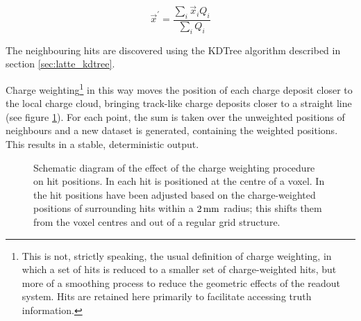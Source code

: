 \begin{equation}\label{eqn:charge_weighted_avg_position}
	\vec{x}^\prime = \frac{\displaystyle \sum_i \vec{x}_i Q_i}{\displaystyle \sum_i Q_i}
\end{equation}

The neighbouring hits are discovered using the \ac{KDTree} algorithm described in section \ref{sec:latte_kdtree}.

Charge weighting\footnote{This is not, strictly speaking, the usual definition of charge weighting, in which a set of hits is reduced to a smaller set of charge-weighted hits, but more of a smoothing process to reduce the geometric effects of the readout system. Hits are retained here primarily to facilitate accessing truth information.} in this way moves the position of each charge deposit closer to the local charge cloud, bringing track-like charge deposits closer to a straight line (see figure \ref{fig:ca_charge_weighting}). For each point, the sum is taken over the unweighted positions of neighbours and a new dataset is generated, containing the weighted positions. This results in a stable, deterministic output.

\begin{figure}
\centering
{}
\caption[Diagram of the effect of charge weighting on hit position]{\label{fig:ca_charge_weighting}Schematic diagram of the effect of the charge weighting procedure on hit positions. In  each hit is positioned at the centre of a voxel. In  the hit positions have been adjusted based on the charge-weighted positions of surrounding hits within a $2\,\mathrm{mm}$ radius; this shifts them from the voxel centres and out of a regular grid structure.}
\end{figure}

